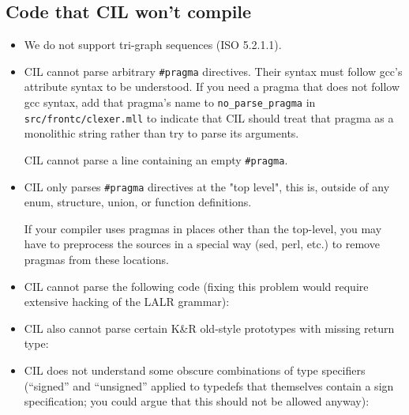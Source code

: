 \documentclass[letterpaper]{article}
\def\t#1{{\tt #1}}
\begin{document}
\subsection{Code that CIL won't compile}
\begin{itemize}
\item We do not support tri-graph sequences (ISO 5.2.1.1).

\item CIL cannot parse arbitrary \t{\#pragma} directives.  Their
  syntax must follow gcc's attribute syntax to be understood.  If you
  need a pragma that does not follow gcc syntax, add that pragma's name
  to \t{no\_parse\_pragma} in \t{src/frontc/clexer.mll} to indicate that
  CIL should treat that pragma as a monolithic string rather than try
  to parse its arguments.

  CIL cannot parse a line containing an empty \t{\#pragma}.

\item CIL only parses \t{\#pragma} directives at the "top level", this is,
  outside of any enum, structure, union, or function definitions.

  If your compiler uses pragmas in places other than the top-level,
  you may have to preprocess the sources in a special way (sed, perl,
  etc.) to remove pragmas from these locations.

\item CIL cannot parse the following code (fixing this problem would require
  extensive hacking of the LALR grammar):

\item CIL also cannot parse certain K\&R old-style prototypes with missing
  return type:

\item CIL does not understand some obscure combinations of type
  specifiers (``signed'' and ``unsigned'' applied to typedefs that
  themselves contain a sign specification; you could argue that this
  should not be allowed anyway):


\end{itemize}
\end{document}
